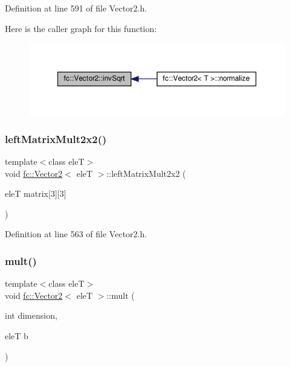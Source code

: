 Definition at line 591 of file Vector2.\+h.

Here is the caller graph for this function\+:
\nopagebreak
\begin{figure}[H]
\begin{center}
\leavevmode
\includegraphics[width=350pt]{d9/d08/classfc_1_1Vector2_a04efdac7c236942670b5a937835b3330_icgraph}
\end{center}
\end{figure}
\mbox{\label{classfc_1_1Vector2_a8509e8227671890c432f39cb66d1940c}} 
\subsubsection{\texorpdfstring{left\+Matrix\+Mult2x2()}{leftMatrixMult2x2()}}
{\footnotesize\ttfamily template$<$class eleT$>$ \\
void \hyperlink{classfc_1_1Vector2}{fc\+::\+Vector2}$<$ eleT $>$\+::left\+Matrix\+Mult2x2 (\begin{DoxyParamCaption}\item[{eleT}]{matrix\mbox{[}3\mbox{]}\mbox{[}3\mbox{]} }\end{DoxyParamCaption})}



Definition at line 563 of file Vector2.\+h.

\mbox{\label{classfc_1_1Vector2_a14fc0e3dd940443f5cd065d2d25b5c3c}} 
\subsubsection{\texorpdfstring{mult()}{mult()}}
{\footnotesize\ttfamily template$<$class eleT$>$ \\
void \hyperlink{classfc_1_1Vector2}{fc\+::\+Vector2}$<$ eleT $>$\+::mult (\begin{DoxyParamCaption}\item[{int}]{dimension,  }\item[{eleT}]{b }\end{DoxyParamCaption})}



